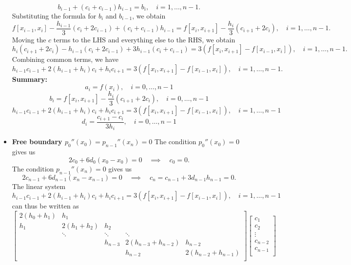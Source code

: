 \documentclass{report}
\begin{document}
\begin{itemize}
            $$b_{i-1} + (c_{i}+c_{i-1}) h_{i-1} = b_{i}, \quad i=1,\ldots,n-1.$$
            Substituting the formula for $b_i$ and $b_{i-1}$, we obtain
            $$f[x_{i-1},x_{i}] - \frac{h_{i-1}}{3}(c_{i} + 2c_{i-1}) + (c_{i}+c_{i-1}) h_{i-1} = f[x_i,x_{i+1}] - \displaystyle{\frac{h_i}{3}}(c_{i+1} + 2c_i), \quad i=1,\ldots,n-1.$$
            \bigbreak \noindent 
            Moving the $c$ terms to the LHS and everything else to the RHS, we obtain
            $$ h_i(c_{i+1} + 2c_i) - h_{i-1}(c_{i} + 2c_{i-1}) + 3 h_{i-1}(c_{i}+c_{i-1}) = 3\left(f[x_i,x_{i+1}] - f[x_{i-1},x_{i}]\right), \quad i=1,\ldots,n-1.$$
            Combining common terms, we have
            $$h_{i-1}c_{i-1} + 2(h_{i-1} + h_i )c_i + h_i c_{i+1} = 3\left(f[x_i,x_{i+1}] - f[x_{i-1},x_{i}]\right), \quad i=1,\ldots,n-1.$$
            \bigbreak \noindent 
            \textbf{Summary:} 
            $$a_i = f(x_i), \quad i=0,\ldots,n-1$$
            $$b_i = f[x_i,x_{i+1}] - \displaystyle{\frac{h_i}{3}}(c_{i+1} + 2c_i), \quad i=0,\ldots,n-1$$
            $$h_{i-1}c_{i-1} + 2(h_{i-1} + h_i )c_i + h_i c_{i+1} = 3\left(f[x_i,x_{i+1}] - f[x_{i-1},x_{i}]\right), \quad i=1,\ldots,n-1$$
            $$d_i = \displaystyle{\frac{c_{i+1} - c_i}{3 h_i}}, \quad i=0,\ldots,n-1$$
        \item \textbf{Free boundary $p_0''(x_0) = p_{n-1}''(x_n) = 0$}
            \bigbreak \noindent 
            The condition $p_0''(x_0) = 0$ gives us 
            $$2 c_0 + 6 d_0 (x_0 - x_0) = 0 \quad \implies \quad c_0 = 0.$$
            The condition $p_{n-1}''(x_n) = 0$ gives us
            $$2 c_{n-1} + 6 d_{n-1} (x_n - x_{n-1}) = 0 \quad \implies \quad c_n = c_{n-1} + 3d_{n-1} h_{n-1} = 0.$$
            The linear system 
            $$h_{i-1}c_{i-1} + 2(h_{i-1} + h_i )c_i + h_i c_{i+1} = 3\left(f[x_i,x_{i+1}] - f[x_{i-1},x_{i}]\right), \quad i=1,\ldots,n-1$$
            can thus be written as
            $$
            \begin{bmatrix}
                2(h_0 + h_1) & h_1 \\
                h_1 & 2(h_1 + h_2) & h_2 \\
                    &\ddots & \ddots & \ddots \\
                    && h_{n-3} & 2(h_{n-3} + h_{n-2}) & h_{n-2} \\
                    &&& h_{n-2} & 2(h_{n-2} + h_{n-1}) \\
            \end{bmatrix}
            \begin{bmatrix}
                c_1\\c_2\\\vdots\\c_{n-2}\\c_{n-1}\\

\end{bmatrix}$$
\end{itemize}
\end{document}
